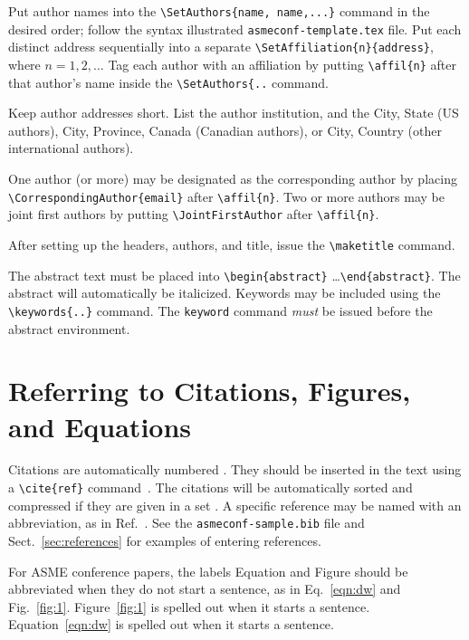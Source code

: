 \documentclass[captionpatch,colorlinks,upint,subscriptcorrection,varvw,mathalfa=cal=boondoxo,german]{asmeconf}
\begin{document}
Put author names into the \verb|\SetAuthors{name, name,...}| command in the desired order; follow the syntax illustrated \texttt{asmeconf-template.tex} file. Put each distinct address sequentially into a separate \verb|\SetAffiliation{n}{address}|, where $n = 1,2,\ldots$ Tag each author with an affiliation by putting \verb|\affil{n}| after that author's name inside the \verb|\SetAuthors{..| command. 

Keep author addresses short.  List the author institution, and the City, State (US authors), City, Province, Canada (Canadian authors), or City, Country (other international authors). 

One author (or more) may be designated as the corresponding author by placing \verb|\CorrespondingAuthor{email}|  after \verb|\affil{n}|. Two or more authors may be joint first authors by putting \verb|\JointFirstAuthor| after \verb|\affil{n}|.

After setting up the headers, authors,  and title, issue the \verb|\maketitle| command. 

The abstract text must be placed into \verb|\begin{abstract}| \ldots \verb|\end{abstract}|. The abstract will automatically be italicized. Keywords may be included using the \verb|\keywords{..}| command. The \texttt{keyword} command \textit{must} be issued before the abstract environment. 


\section{Referring to Citations, Figures, and Equations}

Citations are automatically numbered \cite{ning2002}. They should be inserted in the text using a \verb|\cite{ref}| command~\cite{gibson2008,stevens1999}. The citations will be automatically sorted and compressed if they are given in a set \cite{stevens1999,ning2002,gibson2008,wions2005,smith2002,watson1982}. 
A specific reference may be named with an abbreviation, as in Ref.~\cite{watson1982}.
See the \texttt{asmeconf-sample.bib} file and Sect.~\ref{sec:references} for examples of entering references.

For ASME conference papers, the labels Equation and Figure should be abbreviated when they do not start a sentence, as in  Eq.~\eqref{eqn:dw} and Fig.~\ref{fig:1}. Figure~\ref{fig:1} is spelled out when it starts a sentence. Equation~\eqref{eqn:dw} is spelled out when it starts a sentence. 
\end{document}
